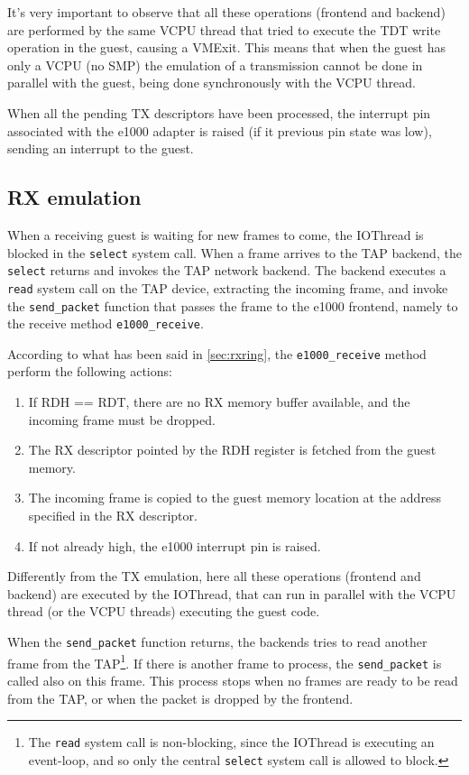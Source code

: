 It's very important to observe that all these operations (frontend and backend) are performed by the same VCPU thread that tried to 
execute the TDT write operation in the guest, causing a VMExit.
This means that when the guest has only a VCPU (no SMP) the emulation of a transmission cannot be done in parallel with the guest, being
done synchronously with the VCPU thread.

\vspace{0.5cm}

When all the pending TX descriptors have been processed, the interrupt pin associated with the e1000 adapter is raised (if it previous
pin state was low), sending an interrupt to the guest.


\subsection{RX emulation}
When a receiving guest is waiting for new frames to come, the IOThread is blocked in the \texttt{select} system call.
When a frame arrives to the TAP backend, the \texttt{select} returns and invokes the TAP network backend.
The backend executes a \texttt{read} system call on the TAP device, extracting the incoming frame, and invoke the \texttt{send\_packet}
function that passes the frame to the e1000 frontend, namely to the receive method \texttt{e1000\_receive}.

According to what has been said in \ref{sec:rxring}, the \texttt{e1000\_receive} method perform the following actions:
\begin{enumerate}
    \item If RDH == RDT, there are no RX memory buffer available, and the incoming frame must be dropped.
    \item The RX descriptor pointed by the RDH register is fetched from the guest memory.
    \item The incoming frame is copied to the guest memory location at the address specified in the RX descriptor.
    \item If not already high, the e1000 interrupt pin is raised.
\end{enumerate}

Differently from the TX emulation, here all these operations (frontend and backend) are executed by the IOThread, that can run in parallel
with the VCPU thread (or the VCPU threads) executing the guest code.

\vspace{0.5cm}

When the \texttt{send\_packet} function returns, the backends tries to read another frame from the TAP\footnote{The \texttt{read}
system call is non-blocking, since the IOThread is executing an event-loop, and so only the central \texttt{select} system call is
allowed to block.}. If there is another frame to process, the \texttt{send\_packet} is called also on this frame.
This process stops when no frames are ready to be read from the TAP, or when the packet is dropped by the frontend.



